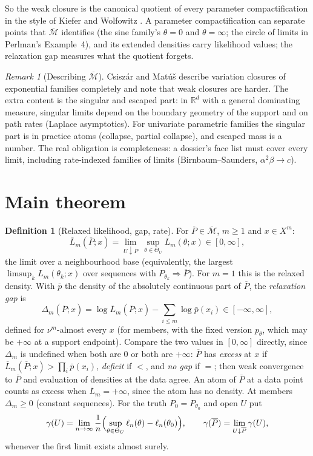 \documentclass[11pt]{article}
\newcommand{\bM}{\overline{\mathcal M}}
\newcommand{\bP}{\overline P}
\newcommand{\bL}{\overline L}
\theoremstyle{definition}
\newtheorem{definition}[theorem]{Definition}
\theoremstyle{remark}
\newtheorem*{remark}{Remark}
\begin{document}
So the weak closure is the canonical quotient of every parameter
compactification in the style of Kiefer and Wolfowitz \cite{kw}. A parameter
compactification can separate points that $\bM$ identifies (the sine family's
$\theta=0$ and $\theta=\infty$; the circle of limits in Perlman's
Example~4), and its extended densities carry likelihood values; the
relaxation gap measures what the quotient forgets.

\begin{remark}[Describing $\bM$]
Csisz\'ar and Mat\'u\v s \cite{cm} describe variation closures of
exponential families completely and note that weak closures are harder.
The extra content is the singular and escaped part: in $\mathbb R^d$ with a
general dominating measure, singular limits depend on the boundary geometry
of the support and on path rates (Laplace asymptotics). For univariate
parametric families the singular part is in practice atoms (collapse,
partial collapse), and escaped mass is a number. The real obligation is
completeness: a dossier's face list must cover every limit, including
rate-indexed families of limits (Birnbaum--Saunders, $\alpha^2\beta\to c$).
\end{remark}

\section{Main theorem}\label{sec:main}
\begin{definition}[Relaxed likelihood, gap, rate]\label{def:relaxed}
For $\bP\in\bM$, $m\ge1$ and $x\in X^m$:
\[
 \bL_m(\bP;x)=\lim_{U\downarrow\bP}\ \sup_{\theta\in\Theta_U}L_m(\theta;x)
 \in[0,\infty],
\]
the limit over a neighbourhood base (equivalently, the largest
$\limsup_kL_m(\theta_k;x)$ over sequences with $P_{\theta_k}\Rightarrow\bP$).
For $m=1$ this is the relaxed density. With $\bar p$ the density of the
absolutely continuous part of $\bP$, the \emph{relaxation gap} is
\[
 \Delta_m(\bP;x)=\log\bL_m(\bP;x)-\sum_{i\le m}\log\bar p(x_i)\in[-\infty,\infty],
\]
defined for $\nu^m$-almost every $x$ (for members, with the fixed version
$p_\theta$, which may be $+\infty$ at a support endpoint). Compare the two
values in $[0,\infty]$ directly, since $\Delta_m$ is undefined when both are
$0$ or both are $+\infty$: $\bP$ has \emph{excess} at $x$ if
$\bL_m(\bP;x)>\prod_i\bar p(x_i)$, \emph{deficit} if $<$, and \emph{no gap}
if $=$; then weak convergence to $\bP$ and evaluation of densities at the
data agree. An atom of $\bP$ at a data point counts as excess when
$\bL_m=+\infty$, since the atom has no density. At members $\Delta_m\ge0$ (constant
sequences). For the truth
$P_0=P_{\theta_0}$ and open $U$ put
\[
 \gamma(U)=\lim_{n\to\infty}\frac1n\Bigl(\sup_{\theta\in\Theta_U}\ell_n(\theta)
 -\ell_n(\theta_0)\Bigr),
 \qquad
 \gamma(\bP)=\lim_{U\downarrow\bP}\gamma(U),
\]
whenever the first limit exists almost surely.
\end{definition}
\end{document}
